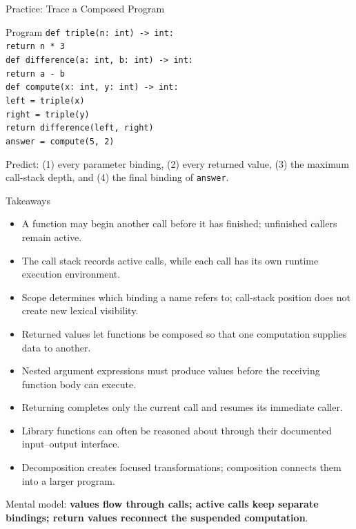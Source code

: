 \documentclass[aspectratio=169,10pt]{beamer}
\begin{document}
\begin{frame}[shrink=5]{Practice: Trace a Composed Program}
  \begin{block}{Program}
    \texttt{def triple(n: int) -> int:}\\
    \hspace*{0.20in}\texttt{return n * 3}\\[0.05in]
    \texttt{def difference(a: int, b: int) -> int:}\\
    \hspace*{0.20in}\texttt{return a - b}\\[0.05in]
    \texttt{def compute(x: int, y: int) -> int:}\\
    \hspace*{0.20in}\texttt{left = triple(x)}\\
    \hspace*{0.20in}\texttt{right = triple(y)}\\
    \hspace*{0.20in}\texttt{return difference(left, right)}\\[0.05in]
    \texttt{answer = compute(5, 2)}
  \end{block}

  \begin{activity}
    Predict: (1) every parameter binding, (2) every returned value, (3) the maximum call-stack depth, and (4) the final binding of \texttt{answer}.
  \end{activity}
\end{frame}

\begin{frame}[shrink=12]{Takeaways}
  \begin{itemize}
    \item A function may begin another call before it has finished; unfinished callers remain active.
    \item The call stack records active calls, while each call has its own runtime execution environment.
    \item Scope determines which binding a name refers to; call-stack position does not create new lexical visibility.
    \item Returned values let functions be composed so that one computation supplies data to another.
    \item Nested argument expressions must produce values before the receiving function body can execute.
    \item Returning completes only the current call and resumes its immediate caller.
    \item Library functions can often be reasoned about through their documented input--output interface.
    \item Decomposition creates focused transformations; composition connects them into a larger program.
  \end{itemize}

  \begin{keyidea}
    Mental model: \textbf{values flow through calls; active calls keep separate bindings; return values reconnect the suspended computation}.
  \end{keyidea}
\end{frame}

\end{document}
